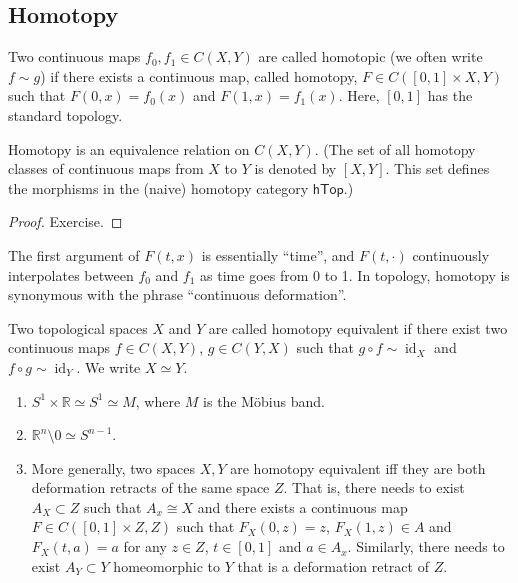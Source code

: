 \documentclass[english,letterpaper]{article}%
\numberwithin{equation}{section}
\numberwithin{figure}{section}
\numberwithin{table}{section}
\theoremstyle{definition}
\theoremstyle{definition}
\theoremstyle{definition}
\theoremstyle{plain}
\theoremstyle{plain}
\theoremstyle{plain}
\theoremstyle{plain}
\theoremstyle{remark}
\theoremstyle{remark}
\DeclareMathOperator{\id}{id}
\begin{document}
\subsection{Homotopy}\label{sec.homotopy}
\begin{defn} Two continuous maps $f_0,f_1\in C(X, Y)$ are called homotopic (we often write $f\sim g$) if there exists a continuous map, called homotopy, $F\in C([0,1]\times X,Y)$ such that $F(0,x)=f_0(x)$ and $F(1,x)=f_1(x)$. Here, $[0,1]$ has the standard topology.
\end{defn}
\begin{prop}
Homotopy is an equivalence relation on $C(X,Y)$. (The set of all homotopy classes of continuous maps from $X$ to $Y$ is denoted by $[X,Y]$. This set defines the morphisms in the (naive) homotopy category $\mathsf{hTop}$.)
\end{prop}
\begin{proof}
Exercise.
\end{proof}

The first argument of $F(t,x)$ is essentially ``time'', and $F(t,\cdot)$ continuously interpolates between $f_0$ and $f_1$ as time goes from 0 to 1. In topology, homotopy is synonymous with the phrase ``continuous deformation''.

\begin{defn}
Two topological spaces $X$ and $Y$ are called homotopy equivalent if there exist two continuous maps $f\in C(X,Y)$, $g\in C(Y,X)$ such that $g\circ f\sim \id_X$ and $f\circ g\sim \id_Y$. We write $X\simeq Y$.
\end{defn}

\begin{example}
\begin{enumerate}
    \item $S^1\times\mathbb{R}\simeq S^1\simeq M$, where $M$ is the M\"obius band.
    \item $\mathbb{R}^n\setminus{0}\simeq S^{n-1}$.
    \item More generally, two spaces $X,Y$ are homotopy equivalent iff they are both deformation retracts of the same space $Z$. That is, there needs to exist $A_X\subset Z$ such that $A_x\cong X$ and there exists a continuous map $F\in C([0,1]\times Z,Z)$ such that $F_X(0,z)=z$, $F_X(1,z)\in A$ and $F_X(t,a)=a$ for any $z\in Z$, $t\in [0,1]$ and $a\in A_x$. Similarly, there needs to exist $A_Y\subset Y$ homeomorphic to $Y$ that is a deformation retract of $Z$.
\end{enumerate}
\end{example}
\end{document}
